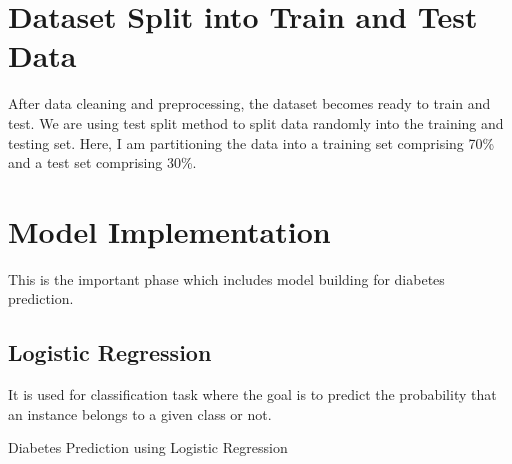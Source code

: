 \section{Dataset Split into Train and Test Data}
After data cleaning and preprocessing, the dataset becomes ready to train and test. We are using test split method to split data randomly into the training and testing set. Here, I am partitioning the data into a training set comprising 70\% and a test set comprising 30\%.

\section{Model Implementation}
This is the important phase which includes model building for diabetes prediction.

\subsection{Logistic Regression}
It is used for classification task where the goal is to predict the probability that an instance belongs to a given class or not.

\begin{algorithm}
    \caption{Diabetes Prediction using Logistic Regression}
    \label{algo:algo_lr}
    \begin{algorithmic}[1]
        \Statex
    \end{algorithmic}
\end{algorithm}

